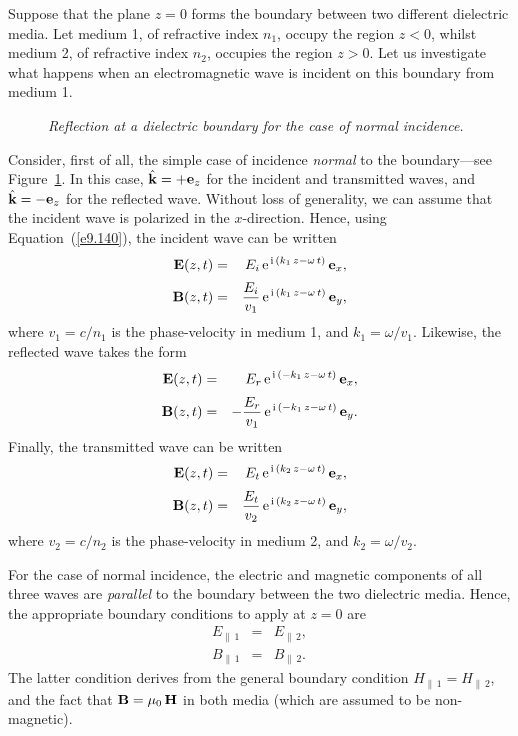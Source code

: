 Suppose that the plane $z=0$ forms the boundary between two different dielectric
media. Let medium 1, of refractive index $n_1$, occupy the region $z<0$,
whilst medium 2, of refractive index $n_2$, occupies the region $z>0$.
Let us investigate what happens when an electromagnetic wave is incident
on this boundary from medium 1.

\begin{figure}
\epsfysize=2.5in
\centerline{}
\caption{\em Reflection at a dielectric boundary for the case of normal incidence.}\label{f48}
\end{figure}

Consider, first of all, the simple case of incidence {\em normal}\/
to the boundary---see Figure~\ref{f48}. In this case, $\hat{\bf k} = +{\bf e}_z$ for the
incident and transmitted waves, and $\hat{\bf k} = -{\bf e}_z$ 
for the reflected wave. Without loss of generality, we can assume that
the incident wave is polarized in the $x$-direction.
Hence, using Equation~(\ref{e9.140}), the incident
wave can be written
\begin{eqnarray}
{\bf E}(z,t) &=& E_i\,{\rm e}^{\,{\rm i}\,(k_1\,z-\omega\,t)}
\,{\bf e}_x,\\[0.5ex]
{\bf B}(z,t)&=&\frac{E_i}{v_1}\,{\rm e}^{\,{\rm i}\,(k_1\,z-\omega\,t)}\,{\bf e}_y,
\end{eqnarray}
where $v_1=c/n_1$ is the phase-velocity in medium 1, and $k_1=\omega/v_1$. Likewise, the reflected wave takes the form
\begin{eqnarray}
{\bf E}(z,t) &=& E_r\,{\rm e}^{\,{\rm i}\,(-k_1\,z-\omega\,t)}\,{\bf e}_x,\\[0.5ex]
{\bf B}(z,t) &=&-\frac{E_r}{v_1}\,{\rm e}^{\,{\rm i}\,(-k_1\,z-\omega\,t)}\,{\bf e}_y.
\end{eqnarray}
Finally, the transmitted wave can be written
\begin{eqnarray}
{\bf E}(z,t) &=& E_t\,{\rm e}^{\,{\rm i}\,(k_2\,z-\omega\,t)}\,{\bf e}_x,\\[0.5ex]
{\bf B}(z,t) &=&\frac{E_t}{v_2}\,{\rm e}^{\,{\rm i}\,(k_2\,z-\omega\,t)}\,{\bf e}_y,
\end{eqnarray}
where $v_2=c/n_2$ is the phase-velocity in medium 2, and $k_2=\omega/v_2$.

For the case of normal incidence, the electric and magnetic
components of all three waves are {\em parallel} to the boundary between
the two dielectric media. Hence, the appropriate boundary conditions
to apply at $z=0$ are
\begin{eqnarray}\label{e9.147}
E_{\parallel\,1} &=& E_{\parallel\,2},\\[0.5ex]
B_{\parallel\,1}&=& B_{\parallel\,2}.\label{e9.148}
\end{eqnarray}
The latter condition derives from the general boundary condition
$H_{\parallel\,1} = H_{\parallel\,2}$, and the fact that ${\bf B}=\mu_0\,
{\bf H}$ in both media (which are assumed to be non-magnetic).

